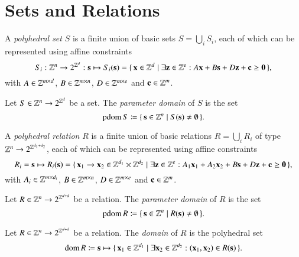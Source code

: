 \section{Sets and Relations}

\begin{definition}
A {\em polyhedral set} $S$ is a finite union of basic sets
$S = \bigcup_i S_i$, each of which can be represented using affine
constraints
$$
S_i : \Z^n \to 2^{\Z^d} : \vec s \mapsto
S_i(\vec s) =
\{\, \vec x \in \Z^d \mid \exists \vec z \in \Z^e :
A \vec x + B \vec s + D \vec z + \vec c \geq \vec 0 \,\}
,
$$
with $A \in \mathbb{Z}^{m \times d}$,
$B \in \mathbb{Z}^{m \times n}$,
$D \in \mathbb{Z}^{m \times e}$
and $\vec c \in \Z^m$.
\end{definition}

\begin{definition}
Let $S \in \mathbb{Z}^n \to 2^{\mathbb{Z}^d}$ be a set.
The {\em parameter domain} of $S$ is the set
$$\pdom S \coloneqq \{\, \vec s \in \Z^n \mid S(\vec s) \ne \emptyset \,\}.$$
\end{definition}

\begin{definition}
A {\em polyhedral relation}
$R$ is a finite union of basic relations
$R = \bigcup_i R_i$ of type
$\mathbb{Z}^n \to 2^{\mathbb{Z}^{d_1+d_2}}$,
each of which can be represented using affine
constraints
$$
R_i = \vec s \mapsto
R_i(\vec s) =
\{\, \vec x_1 \to \vec x_2 \in \Z^{d_1} \times \Z^{d_2}
\mid \exists \vec z \in \Z^e :
A_1 \vec x_1 + A_2 \vec x_2 + B \vec s + D \vec z + \vec c \geq \vec 0 \,\}
,
$$
with $A_i \in \mathbb{Z}^{m \times d_i}$,
$B \in \mathbb{Z}^{m \times n}$,
$D \in \mathbb{Z}^{m \times e}$
and $\vec c \in \Z^m$.
\end{definition}

\begin{definition}
Let $R \in \mathbb{Z}^n \to 2^{\mathbb{Z}^{d+d}}$ be a relation.
The {\em parameter domain} of $R$ is the set
$$\pdom R \coloneqq \{\, \vec s \in \Z^n \mid R(\vec s) \ne \emptyset \,\}.$$
\end{definition}

\begin{definition}
Let $R \in \mathbb{Z}^n \to 2^{\mathbb{Z}^{d+d}}$ be a relation.
The {\em domain} of $R$ is the polyhedral set
$$\domain R \coloneqq \vec s \mapsto
\{\, \vec x_1 \in \Z^{d_1} \mid \exists \vec x_2 \in \Z^{d_2} :
(\vec x_1, \vec x_2) \in R(\vec s) \,\}
.
$$
\end{definition}

